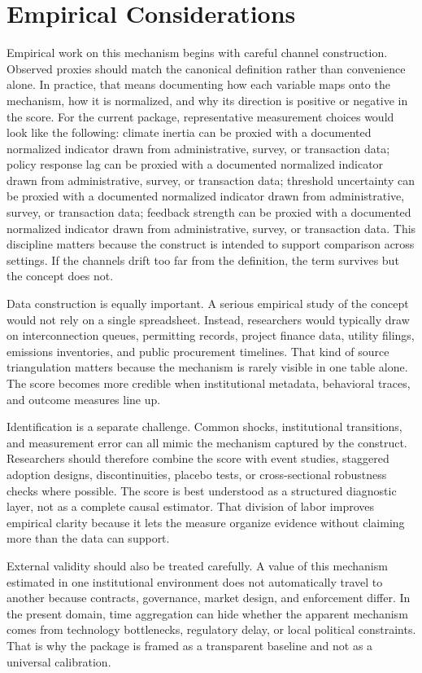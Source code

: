 \documentclass[12pt]{article}
\begin{document}
\section{Empirical Considerations}
Empirical work on this mechanism begins with careful channel construction. Observed proxies should match the canonical definition rather than convenience alone. In practice, that means documenting how each variable maps onto the mechanism, how it is normalized, and why its direction is positive or negative in the score. For the current package, representative measurement choices would look like the following: climate inertia can be proxied with a documented normalized indicator drawn from administrative, survey, or transaction data; policy response lag can be proxied with a documented normalized indicator drawn from administrative, survey, or transaction data; threshold uncertainty can be proxied with a documented normalized indicator drawn from administrative, survey, or transaction data; feedback strength can be proxied with a documented normalized indicator drawn from administrative, survey, or transaction data. This discipline matters because the construct is intended to support comparison across settings. If the channels drift too far from the definition, the term survives but the concept does not.

Data construction is equally important. A serious empirical study of the concept would not rely on a single spreadsheet. Instead, researchers would typically draw on interconnection queues, permitting records, project finance data, utility filings, emissions inventories, and public procurement timelines. That kind of source triangulation matters because the mechanism is rarely visible in one table alone. The score becomes more credible when institutional metadata, behavioral traces, and outcome measures line up.

Identification is a separate challenge. Common shocks, institutional transitions, and measurement error can all mimic the mechanism captured by the construct. Researchers should therefore combine the score with event studies, staggered adoption designs, discontinuities, placebo tests, or cross-sectional robustness checks where possible. The score is best understood as a structured diagnostic layer, not as a complete causal estimator. That division of labor improves empirical clarity because it lets the measure organize evidence without claiming more than the data can support.

External validity should also be treated carefully. A value of this mechanism estimated in one institutional environment does not automatically travel to another because contracts, governance, market design, and enforcement differ. In the present domain, time aggregation can hide whether the apparent mechanism comes from technology bottlenecks, regulatory delay, or local political constraints. That is why the package is framed as a transparent baseline and not as a universal calibration.
\end{document}
